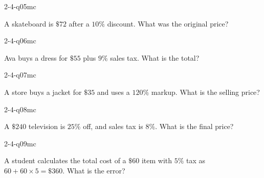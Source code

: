 \begin{practiceQuestion}{2-4-q05}{mc}
\begin{questionText}
A skateboard is $\$72$ after a $10\%$ discount. What was the original price?
\end{questionText}
\end{practiceQuestion}

\begin{practiceQuestion}{2-4-q06}{mc}
\begin{questionText}
Ava buys a dress for $\$55$ plus $9\%$ sales tax. What is the total?
\end{questionText}
\end{practiceQuestion}

\begin{practiceQuestion}{2-4-q07}{mc}
\begin{questionText}
A store buys a jacket for $\$35$ and uses a $120\%$ markup. What is the selling price?
\end{questionText}
\end{practiceQuestion}

\begin{practiceQuestion}{2-4-q08}{mc}
\begin{questionText}
A $\$240$ television is $25\%$ off, and sales tax is $8\%$. What is the final price?
\end{questionText}
\end{practiceQuestion}

\begin{practiceQuestion}{2-4-q09}{mc}
\begin{questionText}
A student calculates the total cost of a $\$60$ item with $5\%$ tax as $60 + 60 \times 5 = \$360$. What is the error?
\end{questionText}
\end{practiceQuestion}

